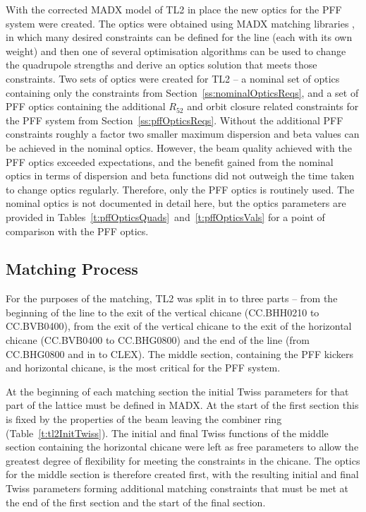 With the corrected MADX model of TL2 in place the new optics for the PFF system were created. The optics were obtained using MADX matching libraries \cite{madx}, in which many desired constraints can be defined for the line (each with its own weight) and then one of several optimisation algorithms can be used to change the quadrupole strengths and derive an optics solution that meets those constraints. Two sets of optics were created for TL2 -- a nominal set of optics containing only the constraints from Section~\ref{ss:nominalOpticsReqs}, and a set of PFF optics containing the additional \(R_{52}\) and orbit closure related constraints for the PFF system from Section~\ref{ss:pffOpticsReqs}. Without the additional PFF constraints roughly a factor two smaller maximum dispersion and beta values can be achieved in the nominal optics. However, the beam quality achieved with the PFF optics exceeded expectations, and the benefit gained from the nominal optics in terms of dispersion and beta functions did not outweigh the time taken to change optics regularly. Therefore, only the PFF optics is routinely used. The nominal optics is not documented in detail here, but the optics parameters are provided in Tables~\ref{t:pffOpticsQuads}~and~\ref{t:pffOpticsVals} for a point of comparison with the PFF optics.

\subsection{Matching Process}
\label{ss:matchingMethod}

For the purposes of the matching, TL2 was split in to three parts -- from the beginning of the line to the exit of the vertical chicane (CC.BHH0210 to CC.BVB0400), from the exit of the vertical chicane to the exit of the horizontal chicane (CC.BVB0400 to CC.BHG0800) and the end of the line (from CC.BHG0800 and in to CLEX). The middle section, containing the PFF kickers and horizontal chicane, is the most critical for the PFF system.

At the beginning of each matching section the initial Twiss parameters for that part of the lattice must be defined in MADX. At the start of the first section this is fixed by the properties of the beam leaving the combiner ring (Table~\ref{t:tl2InitTwiss}). The initial and final Twiss functions of the middle section containing the horizontal chicane were left as free parameters to allow the greatest degree of flexibility for meeting the constraints in the chicane. The optics for the middle section is therefore created first, with the resulting initial and final Twiss parameters forming additional matching constraints that must be met at the end of the first section and the start of the final section.

